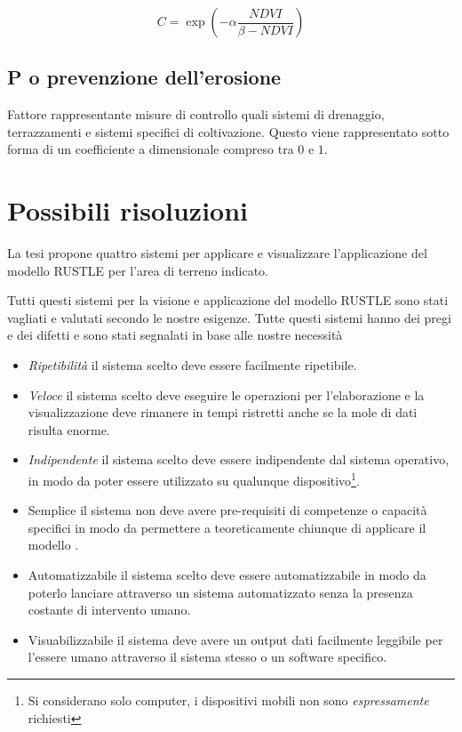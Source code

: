 \begin{equation}\label{eq:c}
	C=\exp\left( -\alpha \dfrac{NDVI}{\beta -NDVI} \right)
\end{equation}

\subsection{P o prevenzione dell'erosione}
Fattore rappresentante misure di controllo quali sistemi di drenaggio, terrazzamenti e sistemi specifici di coltivazione.
Questo viene rappresentato sotto forma di un coefficiente a dimensionale compreso tra $0$ e $1$.

\section{Possibili risoluzioni}
La tesi \cite{tesi:ambientale} propone quattro sistemi per applicare e visualizzare l'applicazione del modello RUSTLE per l'area di terreno indicato.

Tutti questi sistemi per la visione e applicazione del modello RUSTLE sono stati vagliati e valutati secondo le nostre esigenze. Tutte questi sistemi hanno dei pregi e dei difetti e sono stati segnalati in base alle nostre necessità

\begin{itemize}

	\item \textit{Ripetibilità} il sistema scelto deve essere facilmente ripetibile.

	\item \textit{Veloce} il sistema scelto deve eseguire le operazioni per l'elaborazione e la visualizzazione deve rimanere in tempi ristretti anche se la mole di dati risulta enorme.

	\item \textit{Indipendente} il sistema scelto deve essere indipendente dal sistema operativo, in modo da poter essere utilizzato su qualunque dispositivo\footnote{Si considerano solo computer, i dispositivi mobili non sono \textit{espressamente} richiesti}.

	\item{Semplice} il sistema non deve avere pre-requisiti di competenze o capacità specifici in modo da permettere a teoreticamente chiunque di applicare il modello \rusle.

	\item{Automatizzabile} il sistema scelto deve essere automatizzabile in modo da poterlo lanciare attraverso un sistema automatizzato senza la presenza costante di intervento umano.

	\item{Visuabilizzabile} il sistema deve avere un output dati facilmente leggibile per l'essere umano attraverso il sistema stesso o un software specifico.

\end{itemize}

